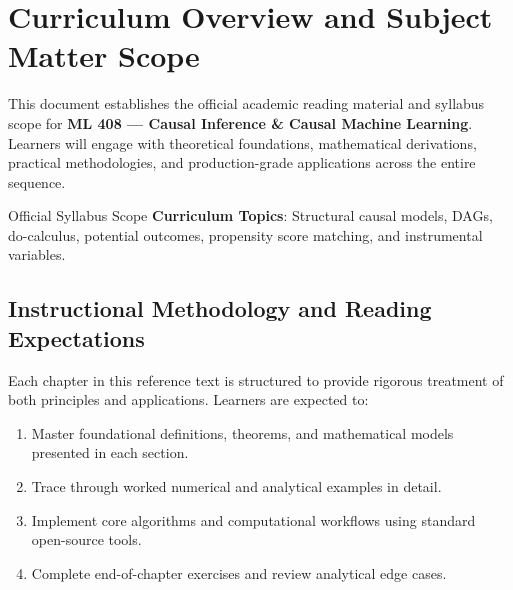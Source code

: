 \section{Curriculum Overview and Subject Matter Scope}

This document establishes the official academic reading material and syllabus scope for \textbf{ML 408 --- Causal Inference \& Causal Machine Learning}. Learners will engage with theoretical foundations, mathematical derivations, practical methodologies, and production-grade applications across the entire sequence.

\begin{InsightBox}{Official Syllabus Scope}
  \textbf{Curriculum Topics}: Structural causal models, DAGs, do-calculus, potential outcomes, propensity score matching, and instrumental variables.
\end{InsightBox}

\subsection{Instructional Methodology and Reading Expectations}

Each chapter in this reference text is structured to provide rigorous treatment of both principles and applications. Learners are expected to:
\begin{enumerate}
  \item Master foundational definitions, theorems, and mathematical models presented in each section.
  \item Trace through worked numerical and analytical examples in detail.
  \item Implement core algorithms and computational workflows using standard open-source tools.
  \item Complete end-of-chapter exercises and review analytical edge cases.
\end{enumerate}

